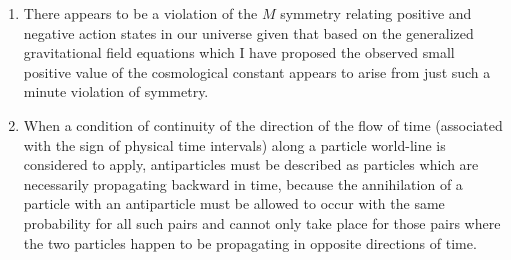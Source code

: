 \documentclass[notitlepage,12pt]{report}
\begin{document}
\begin{enumerate}
\item There appears to be a violation of the $M$ symmetry relating positive and negative action states in our universe given that based on the generalized gravitational field equations which I have proposed the observed small positive value of the cosmological constant appears to arise from just such a minute violation of symmetry.

\item When a condition of continuity of the direction of the flow of time (associated with the sign of physical time intervals) along a particle world-line is considered to apply, antiparticles must be described as particles which are necessarily propagating backward in time, because the annihilation of a particle with an antiparticle must be allowed to occur with the same probability for all such pairs and cannot only take place for those pairs where the two particles happen to be propagating in opposite directions of time.


\end{enumerate}
\end{document}
